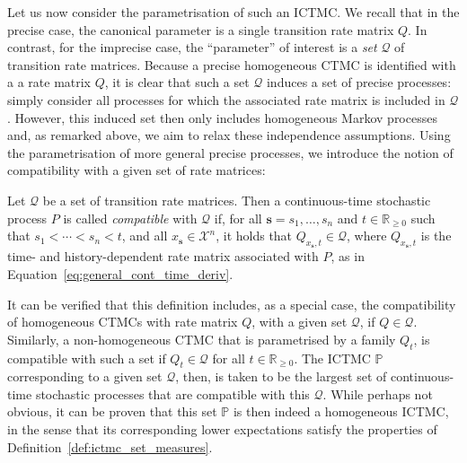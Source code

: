 \documentclass[graybox]{svmult}
\newcommand{\reals}{\mathbb{R}}
\newcommand{\realsnonneg}{\reals_{\geq 0}}
\newcommand{\states}{\mathcal{X}}
\begin{document}
Let us now consider the parametrisation of such an ICTMC. We recall that in the precise case, the canonical parameter is a single transition rate matrix $Q$. In contrast, for the imprecise case, the ``parameter'' of interest is a \emph{set} $\mathcal{Q}$ of transition rate matrices.
Because a precise homogeneous CTMC is identified with a a rate matrix $Q$, it is clear that such a set $\mathcal{Q}$ induces a set of precise processes: simply consider all processes for which the associated rate matrix is included in $\mathcal{Q}$. However, this induced set then only includes homogeneous Markov processes and, as remarked above, we aim to relax these independence assumptions. Using the parametrisation of more general precise processes, we introduce the notion of compatibility with a given set of rate matrices:
\begin{definition}\label{def:compatible_process}
Let $\mathcal{Q}$ be a set of transition rate matrices. Then a continuous-time stochastic process $P$ is called \emph{compatible} with $\mathcal{Q}$ if, for all $\mathbf{s}=s_1,\ldots,s_n$ and $t\in\realsnonneg$ such that $s_1<\cdots<s_n<t$, and all $x_\mathbf{s}\in\states^n$, it holds that $Q_{x_\mathbf{s},t}\in\mathcal{Q}$, where $Q_{x_\mathbf{s},t}$ is the time- and history-dependent rate matrix associated with $P$, as in Equation~\eqref{eq:general_cont_time_deriv}.
\end{definition}
It can be verified that this definition includes, as a special case, the compatibility of homogeneous CTMCs with rate matrix $Q$, with a given set $\mathcal{Q}$, if $Q\in\mathcal{Q}$. Similarly, a non-homogeneous CTMC that is parametrised by a family $Q_t$, is compatible with such a set if $Q_t\in\mathcal{Q}$ for all $t\in\realsnonneg$. The ICTMC $\mathbb{P}$ corresponding to a given set $\mathcal{Q}$, then, is taken to be the largest set of continuous-time stochastic processes that are compatible with this $\mathcal{Q}$. While perhaps not obvious, it can be proven that this set $\mathbb{P}$ is then indeed a homogeneous ICTMC, in the sense that its corresponding lower expectations satisfy the properties of Definition~\ref{def:ictmc_set_measures}.
\end{document}
